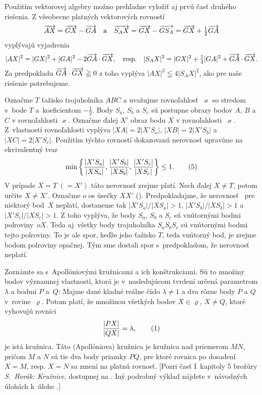 {\poznamka
Použitím vektorovej algebry možno prehľadne vyložiť aj
prvú časť druhého riešenia. Z všeobecne platných vektorových
rovností
$$
\overrightarrow{AX}=\overrightarrow{GX}-\overrightarrow{GA}\quad\hbox{a}\quad
\overrightarrow{S_AX}=\overrightarrow{GX}-\overrightarrow{GS_A}=\overrightarrow{GX}+\tfrac12\overrightarrow{GA}
$$
vyplývajú vyjadrenia
$$
|AX|^2=|GX|^2+|GA|^2-2\overrightarrow{GA}\cdot\overrightarrow{GX},\quad\hbox{resp.}\quad
|S_AX|^2=|GX|^2+\tfrac14|GA|^2+\overrightarrow{GA}\cdot\overrightarrow{GX}.
$$
Za predpokladu $\overrightarrow{GA}\cdot\overrightarrow{GX}\geqq0$ z toho vyplýva
$|AX|^2\leqq4|S_AX|^2$, ako pre naše riešenie potrebujeme.

\ineriesenie
Označme $T$ ťažisko trojuholníka $ABC$ a uvažujme rovnoľahlosť~$\varkappa$ so stredom v~bode $T$ a~koeficientom $-\frac12$. Body $S_a$, $S_b$ a $S_c$ sú postupne obrazy bodov $A$, $B$ a $C$ v rovnoľahlosti $\varkappa$. Označme ďalej $X'$ obraz bodu $X$ v rovnoľahlosti~$\varkappa$. Z~vlastností rovnoľahlosti vyplýva $|XA|=2|X'S_a|$, $|XB|=2|X'S_b|$ a $|XC|=2|X'S_c|$. Použitím týchto rovností dokazovanú nerovnosť upravíme na ekvivalentný tvar
$$
\min \left \{\frac {|X'S_a|}{|XS_a|}, \frac {|X'S_b|}{|XS_b|}, \frac {|X'S_c|}{|XS_c|} \right\} \le 1.
\tag5
$$
V prípade $X= T\;(= X')$ táto nerovnosť zrejme platí. Nech ďalej $X\ne T$, potom určite $X\ne X'$. Označme $o$ os úsečky $XX'$ (\obr). Predpokladajme, že nerovnosť~ pre niektorý bod~$X$ neplatí, dostaneme tak $|X'S_a|/|XS_a|>1$, $|X'S_b|/|XS_b|>1$ a~$|X'S_c|/|XS_c|>1$. Z toho vyplýva, že body $S_a$, $S_b$ a $S_c$ sú vnútornými bodmi polroviny~$oX$. Teda aj~všetky body trojuholníka $S_aS_bS_c$ sú vnútornými bodmi tejto polroviny. To je ale spor, keďže jeho ťažisko $T$, teda vnútorný bod, je zrejme bodom polroviny opačnej. Tým sme dostali spor s~predpokladom, že nerovnosť~ neplatí.


Zoznámte sa s~Apollóniovými kružnicami a ich konštrukciami.
Sú to množiny bodov významnej vlastnosti, ktorá je v~nasledujúcom
tvrdení určená parametrom $\lambda$ a bodmi $P$ a~$Q$: Majme dané
kladné reálne číslo $\lambda\ne1$ a dva rôzne body $P$ a
$Q$ v~rovine~$\varrho$. Potom platí, že množinou všetkých bodov $X\in\varrho$,
$X\ne Q$, ktoré vyhovujú rovnici
$$
\frac{|PX|}{|QX|}=\lambda,
\tag1$$
je istá kružnica. Táto (Apollóniova) kružnica je kružnica nad
priemerom $MN$, pričom $M$ a $N$ sú tie dva body priamky $PQ$, pre
ktoré rovnica  po dosadení $X=M$, resp. $X=N$ sa zmení na platnú
rovnosť.
[Pozri časť I~kapitoly 5 brožúry {\it S.~Horák: Kružnice},
dostupnej na . Iný
podrobný výklad nájdete v~návodných úlohách k~úlohe
.]

}
